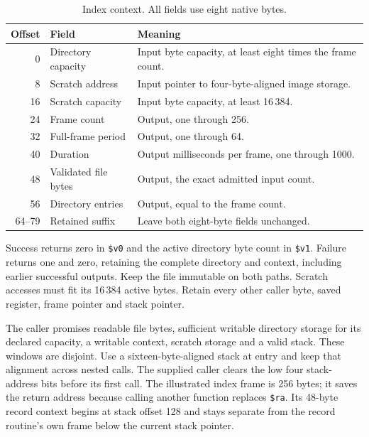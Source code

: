 \begin{table}[htbp]
  \centering
  \caption{Index context. All fields use eight native bytes.}
  \label{tab:video-index-context}
  \begin{tabular}{r p{1.5in} p{2.8in}}
    \toprule
    Offset & Field                & Meaning                                                    \\
    \midrule
    0      & Directory capacity   & Input byte capacity, at least eight times the frame count. \\
    8      & Scratch address      & Input pointer to four-byte-aligned image storage.          \\
    16     & Scratch capacity     & Input byte capacity, at least 16\,384.                     \\
    24     & Frame count          & Output, one through 256.                                   \\
    32     & Full-frame period    & Output, one through 64.                                    \\
    40     & Duration             & Output milliseconds per frame, one through 1000.           \\
    48     & Validated file bytes & Output, the exact admitted input count.                    \\
    56     & Directory entries    & Output, equal to the frame count.                          \\
    64--79 & Retained suffix      & Leave both eight-byte fields unchanged.                    \\
    \bottomrule
  \end{tabular}
\end{table}

Success returns zero in \texttt{\$v0} and the active directory byte count in
\texttt{\$v1}. Failure returns one and zero, retaining the complete directory
and context, including earlier successful outputs. Keep the file immutable on
both paths. Scratch accesses must fit its 16\,384 active bytes. Retain every
other caller byte, saved register, frame pointer and stack pointer.

The caller promises readable file bytes, sufficient writable directory storage
for its declared capacity, a writable context, scratch storage and a valid stack.
These windows are disjoint. Use a sixteen-byte-aligned stack at entry and keep
that alignment across nested calls. The supplied caller clears the low four
stack-address bits before its first call. The illustrated index frame is 256
bytes; it saves the return address because calling another function replaces
\texttt{\$ra}. Its 48-byte record context begins at stack offset 128 and stays
separate from the record routine's own frame below the current stack pointer.

